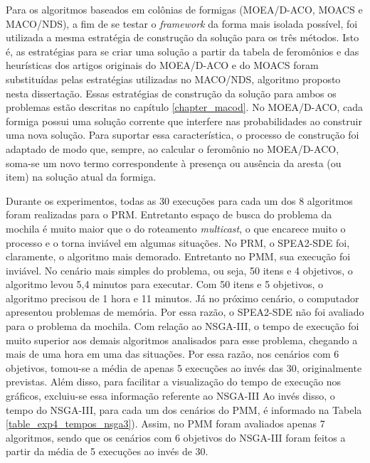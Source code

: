Para os algoritmos baseados em colônias de formigas (MOEA/D-ACO, MOACS e MACO/NDS), a fim de se testar o \textit{framework} da forma mais isolada possível, foi utilizada a mesma estratégia de construção da solução para os três métodos. Isto é, as estratégias para se criar uma solução a partir da tabela de feromônios e das heurísticas dos artigos originais do MOEA/D-ACO e do MOACS foram substituídas pelas estratégias utilizadas no MACO/NDS, algoritmo proposto nesta dissertação. Essas estratégias de construção da solução para ambos os problemas estão descritas no capítulo \ref{chapter_macod}. No MOEA/D-ACO, cada formiga possui uma solução corrente que interfere nas probabilidades ao construir uma nova solução. Para suportar essa característica, o processo de construção foi adaptado de modo que, sempre, ao calcular o feromônio no MOEA/D-ACO, soma-se um novo termo correspondente à presença ou ausência da aresta (ou item) na solução atual da formiga.

Durante os experimentos, todas as 30 execuções para cada um dos 8 algoritmos foram realizadas para o PRM. Entretanto espaço de busca do problema da mochila é muito maior que o do roteamento \textit{multicast}, o que encarece muito o processo e o torna inviável em algumas situações. No PRM, o SPEA2-SDE foi, claramente, o algoritmo mais demorado. Entretanto no PMM, sua execução foi inviável. No cenário mais simples do problema, ou seja, 50 itens e 4 objetivos, o algoritmo levou 5,4 minutos para executar. Com 50 itens e 5 objetivos, o algoritmo precisou de 1 hora e 11 minutos. Já no próximo cenário, o computador apresentou problemas de memória. Por essa razão, o SPEA2-SDE não foi avaliado para o problema da mochila. Com relação ao NSGA-III, o tempo de execução foi muito superior aos demais algoritmos analisados para esse problema, chegando a mais de uma hora em uma das situações. Por essa razão, nos cenários com 6 objetivos, tomou-se a média de apenas 5 execuções ao invés das 30, originalmente previstas. Além disso, para facilitar a visualização do tempo de execução nos gráficos, excluiu-se essa informação referente ao NSGA-III Ao invés disso, o tempo do NSGA-III, para cada um dos cenários do PMM, é informado na Tabela \ref{table_exp4_tempos_nsga3}). Assim, no PMM foram avaliados apenas 7 algoritmos, sendo que os cenários com 6 objetivos do NSGA-III foram feitos a partir da média de 5 execuções ao invés de 30.


